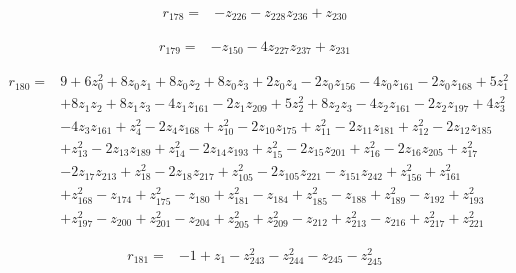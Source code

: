 \par\noindent\begin{minipage}{\linewidth}
\begin{align*}
r_{178}={}&-z_{226}-z_{228}z_{236}+z_{230}
\end{align*}
\end{minipage}\par
\par\noindent\begin{minipage}{\linewidth}
\begin{align*}
r_{179}={}&-z_{150}-4z_{227}z_{237}+z_{231}
\end{align*}
\end{minipage}\par
\par\noindent\begin{minipage}{\linewidth}
\begin{align*}
r_{180}={}&9+6z_{0}^{2}+8z_{0}z_{1}+8z_{0}z_{2}+8z_{0}z_{3}+2z_{0}z_{4}-2z_{0}z_{156}-4z_{0}z_{161}-2z_{0}z_{168}+5z_{1}^{2}\\[-2pt]
&+8z_{1}z_{2}+8z_{1}z_{3}-4z_{1}z_{161}-2z_{1}z_{209}+5z_{2}^{2}+8z_{2}z_{3}-4z_{2}z_{161}-2z_{2}z_{197}+4z_{3}^{2}\\[-2pt]
&-4z_{3}z_{161}+z_{4}^{2}-2z_{4}z_{168}+z_{10}^{2}-2z_{10}z_{175}+z_{11}^{2}-2z_{11}z_{181}+z_{12}^{2}-2z_{12}z_{185}\\[-2pt]
&+z_{13}^{2}-2z_{13}z_{189}+z_{14}^{2}-2z_{14}z_{193}+z_{15}^{2}-2z_{15}z_{201}+z_{16}^{2}-2z_{16}z_{205}+z_{17}^{2}\\[-2pt]
&-2z_{17}z_{213}+z_{18}^{2}-2z_{18}z_{217}+z_{105}^{2}-2z_{105}z_{221}-z_{151}z_{242}+z_{156}^{2}+z_{161}^{2}\\[-2pt]
&+z_{168}^{2}-z_{174}+z_{175}^{2}-z_{180}+z_{181}^{2}-z_{184}+z_{185}^{2}-z_{188}+z_{189}^{2}-z_{192}+z_{193}^{2}\\[-2pt]
&+z_{197}^{2}-z_{200}+z_{201}^{2}-z_{204}+z_{205}^{2}+z_{209}^{2}-z_{212}+z_{213}^{2}-z_{216}+z_{217}^{2}+z_{221}^{2}
\end{align*}
\end{minipage}\par
\par\noindent\begin{minipage}{\linewidth}
\begin{align*}
r_{181}={}&-1+z_{1}-z_{243}^{2}-z_{244}^{2}-z_{245}-z_{245}^{2}
\end{align*}
\end{minipage}\par
